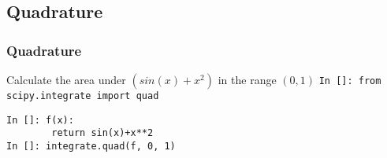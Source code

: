 \documentclass[14pt,compress]{beamer}
\newcommand{\typ}[1]{\lstinline{#1}}
\begin{document}
\subsection{Quadrature}

\begin{frame}[fragile]
\frametitle{Quadrature}
Calculate the area under $(sin(x) + x^2)$ in the range $(0,1)$
\small{\typ{In []: from scipy.integrate import quad}}
  \begin{lstlisting}
In []: f(x):
        return sin(x)+x**2
In []: integrate.quad(f, 0, 1)
  \end{lstlisting}
\end{frame}
\end{document}
